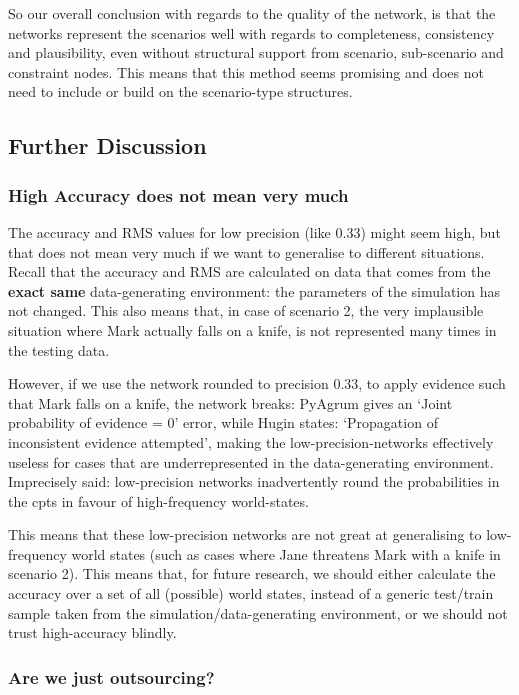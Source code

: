 So our overall conclusion with regards to the quality of the network, is that the networks represent the scenarios well with regards to completeness, consistency and plausibility, even without structural support from scenario, sub-scenario and constraint nodes. This means that this method seems promising and does not need to include or build on the scenario-type structures.

\subsection{Further Discussion}

\subsubsection{High Accuracy does not mean very much}
The accuracy and RMS values for low precision (like 0.33) might seem high, but that does not mean very much if we want to generalise to different situations. Recall that the accuracy and RMS are calculated on data that comes from the \textbf{exact same} data-generating environment: the parameters of the simulation has not changed. This also means that, in case of scenario 2, the very implausible situation where Mark actually falls on a knife, is not represented many times in the testing data. 

However, if we use the network rounded to precision 0.33, to apply evidence such that Mark falls on a knife, the network breaks: PyAgrum gives an `Joint probability of evidence = 0' error, while Hugin states: `Propagation of inconsistent evidence attempted', making the low-precision-networks effectively useless for cases that are underrepresented in the data-generating environment. Imprecisely said: low-precision networks inadvertently round the probabilities in the cpts in favour of high-frequency world-states.

This means that these low-precision networks are not great at generalising to low-frequency world states (such as cases where Jane threatens Mark with a knife in scenario 2). This means that, for future research, we should either calculate the accuracy over a set of all (possible) world states, instead of a generic test/train sample taken from the simulation/data-generating environment, or we should not trust high-accuracy blindly.




\subsubsection{Are we just outsourcing?}

